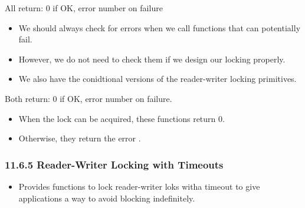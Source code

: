 \documentclass[]{article}
\begin{document}




All return: 0 if OK, error number on failure

\begin{itemize}
\item We should always check for errors when we call functions that can
potentially fail.
\item However, we do not need to check them if we design our locking properly.
\item We also have the conidtional versions of the reader-writer locking
primitives.
\end{itemize}




Both return: 0 if OK, error number on failure.

\begin{itemize}
\item When the lock can be acquired, these functions return 0.
\item Otherwise, they return the error .
\end{itemize}

\subsubsection*{11.6.5 Reader-Writer Locking with Timeouts}
\begin{itemize}
\item Provides functions to lock reader-writer loks witha  timeout to give
applications a way to avoid blocking indefinitely.
\end{itemize}





\end{document}
